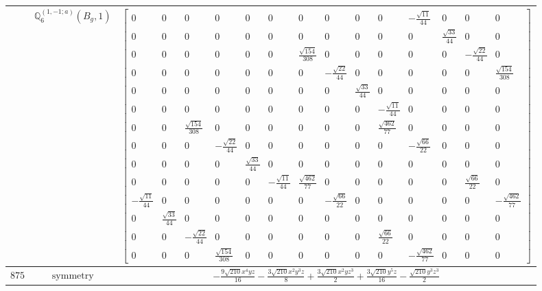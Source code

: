 \documentclass[fleqn,8pt,landscape]{jsarticle}
\begin{document}
\begin{longtable}{ccc}
$  $ & $ \mathbb{Q}_{6}^{(1,-1;a)}(B_{g},1) $ & $ \begin{bmatrix} 0 & 0 & 0 & 0 & 0 & 0 & 0 & 0 & 0 & 0 & - \frac{\sqrt{11}}{44} & 0 & 0 & 0 \\ 0 & 0 & 0 & 0 & 0 & 0 & 0 & 0 & 0 & 0 & 0 & \frac{\sqrt{33}}{44} & 0 & 0 \\ 0 & 0 & 0 & 0 & 0 & 0 & \frac{\sqrt{154}}{308} & 0 & 0 & 0 & 0 & 0 & - \frac{\sqrt{22}}{44} & 0 \\ 0 & 0 & 0 & 0 & 0 & 0 & 0 & - \frac{\sqrt{22}}{44} & 0 & 0 & 0 & 0 & 0 & \frac{\sqrt{154}}{308} \\ 0 & 0 & 0 & 0 & 0 & 0 & 0 & 0 & \frac{\sqrt{33}}{44} & 0 & 0 & 0 & 0 & 0 \\ 0 & 0 & 0 & 0 & 0 & 0 & 0 & 0 & 0 & - \frac{\sqrt{11}}{44} & 0 & 0 & 0 & 0 \\ 0 & 0 & \frac{\sqrt{154}}{308} & 0 & 0 & 0 & 0 & 0 & 0 & \frac{\sqrt{462}}{77} & 0 & 0 & 0 & 0 \\ 0 & 0 & 0 & - \frac{\sqrt{22}}{44} & 0 & 0 & 0 & 0 & 0 & 0 & - \frac{\sqrt{66}}{22} & 0 & 0 & 0 \\ 0 & 0 & 0 & 0 & \frac{\sqrt{33}}{44} & 0 & 0 & 0 & 0 & 0 & 0 & 0 & 0 & 0 \\ 0 & 0 & 0 & 0 & 0 & - \frac{\sqrt{11}}{44} & \frac{\sqrt{462}}{77} & 0 & 0 & 0 & 0 & 0 & \frac{\sqrt{66}}{22} & 0 \\ - \frac{\sqrt{11}}{44} & 0 & 0 & 0 & 0 & 0 & 0 & - \frac{\sqrt{66}}{22} & 0 & 0 & 0 & 0 & 0 & - \frac{\sqrt{462}}{77} \\ 0 & \frac{\sqrt{33}}{44} & 0 & 0 & 0 & 0 & 0 & 0 & 0 & 0 & 0 & 0 & 0 & 0 \\ 0 & 0 & - \frac{\sqrt{22}}{44} & 0 & 0 & 0 & 0 & 0 & 0 & \frac{\sqrt{66}}{22} & 0 & 0 & 0 & 0 \\ 0 & 0 & 0 & \frac{\sqrt{154}}{308} & 0 & 0 & 0 & 0 & 0 & 0 & - \frac{\sqrt{462}}{77} & 0 & 0 & 0 \end{bmatrix} $ \\ \hline
$ 875 $ & $ \text{symmetry} $ & $ - \frac{9 \sqrt{210} x^{4} y z}{16} - \frac{3 \sqrt{210} x^{2} y^{3} z}{8} + \frac{3 \sqrt{210} x^{2} y z^{3}}{2} + \frac{3 \sqrt{210} y^{5} z}{16} - \frac{\sqrt{210} y^{3} z^{3}}{2} $ \\

\end{longtable}
\end{document}
